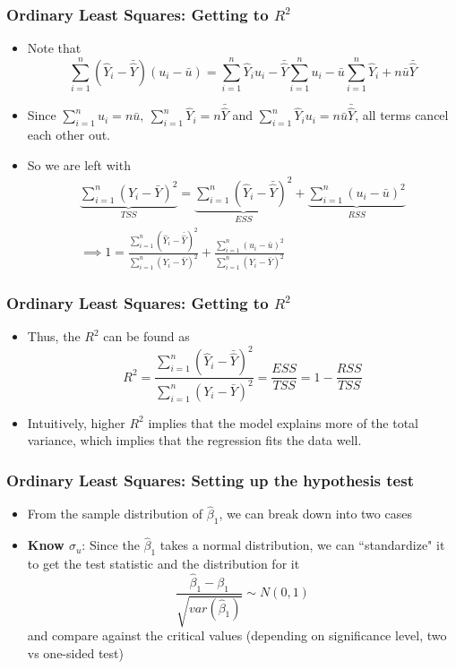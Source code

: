 \documentclass[aspectratio=169]{beamer}
\begin{document}
\begin{frame}
\frametitle{Ordinary Least Squares: Getting to $R^2$}
\begin{itemize}
\item Note that 
\footnotesize{\[
\sum_{i=1}^n(\hat{Y}_i - \bar{\hat{Y}}) (u_i - \bar{u})=\sum_{i=1}^n\hat{Y}_i{u}_i-\bar{\hat{Y}}\sum_{i=1}^nu_i -\bar{u}\sum_{i=1}^n\hat{Y}_i +n\bar{u}\bar{\hat{Y}}
\]}\normalsize
\item Since $\sum_{i=1}^nu_i = n\bar{u},\ \sum_{i=1}^n\hat{Y}_i = n\bar{\hat{Y}}$ and $\sum_{i=1}^n\hat{Y}_iu_i=n\bar{u}\bar{\hat{Y}}$, all terms cancel each other out. 
\item So we are left with
\footnotesize{\begin{gather*}
\underbrace{\sum_{i=1}^n (Y_i-\bar{Y})^2}_{TSS}= \underbrace{\sum_{i=1}^n (\hat{Y}_i - \bar{\hat{Y}})^2}_{ESS}+\underbrace{\sum_{i=1}^n(u_i - \bar{u})^2}_{RSS} \\
\implies 1=\frac{\sum_{i=1}^n (\hat{Y}_i - \bar{\hat{Y}})^2}{\sum_{i=1}^n (Y_i-\bar{Y})^2} + \frac{\sum_{i=1}^n(u_i - \bar{u})^2 }{\sum_{i=1}^n (Y_i-\bar{Y})^2}
\end{gather*}}\normalsize
\end{itemize}
\end{frame}


\begin{frame}
\frametitle{Ordinary Least Squares: Getting to $R^2$}
\begin{itemize}
\item Thus, the $R^2$ can be found as
\[
R^2 = \frac{\sum_{i=1}^n (\hat{Y}_i - \bar{\hat{Y}})^2}{\sum_{i=1}^n (Y_i-\bar{Y})^2} = \frac{ESS}{TSS} = 1-\frac{RSS}{TSS}
\]
\item Intuitively, higher $R^2$ implies that the model explains more of the total variance, which implies that the regression fits the data well. 
\end{itemize}
\end{frame}


\begin{frame}
\frametitle{Ordinary Least Squares: Setting up  the hypothesis test}

\begin{itemize}
\item From the sample distribution of $\hat{\beta}_1$, we can break down into two cases
\item \textbf{Know $\sigma_u$}: Since the $\hat{\beta}_1$ takes a normal distribution, we can ``standardize" it to get the test statistic and the distribution for it
\[
\frac{\hat{\beta}_1-\beta_1}{\sqrt{var(\hat{\beta}_1)}}\sim N(0,1)
\]
and compare against the critical values (depending on significance level, two vs one-sided test)
\end{itemize}
\end{frame}
\end{document}
